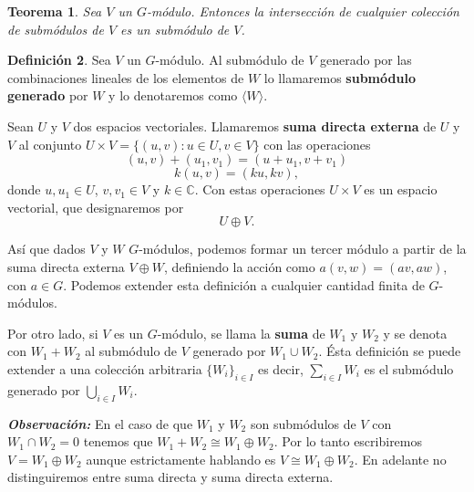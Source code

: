 \documentclass[12pt]{book}
\newtheorem{theorem}{Teorema}[section]
\theoremstyle{definition}
\newtheorem{definition}[theorem]{Definición}
\newcounter{in}
\newcounter{ini}
\begin{document}
\begin{theorem}
  \label{interseccion-submodulos}
  Sea $V$ un $G$-módulo. Entonces la intersección de cualquier
  colección de submódulos de $V$ es un submódulo de $V$.
\end{theorem}

\begin{definition}
  Sea $V$ un $G$-módulo. Al submódulo de $V$ generado por las combinaciones lineales de los
  elementos de $W$ lo llamaremos \textbf{submódulo generado} por $W$ y lo denotaremos como $\langle W\rangle$.
\end{definition}

Sean $U$ y $V$ dos espacios vectoriales. Llamaremos \textbf{suma
  directa externa} de
$U$ y $V$ al conjunto $U\times V=\{(u,v):u\in U,v\in V\}$ con las operaciones
$$(u,v)+(u_{1},v_{1})=(u+u_{1},v+v_{1})$$
$$k(u,v)=(ku,kv),$$
donde $u,u_{1}\in U$, $v,v_{1}\in V$ y $k\in \mathbb{C}$. Con estas
operaciones $U\times V$ es un espacio vectorial, que designaremos por
$$U\oplus V.$$

Así que dados $V$ y $W$ $G$-módulos, podemos formar un tercer módulo a partir
de la suma directa externa $V\oplus W$, definiendo la acción como
$a(v,w)=(av,aw)$, con $a\in G$. Podemos extender esta definición a cualquier
cantidad finita de $G$-módulos.

Por otro lado, si $V$ es un $G$-módulo, se llama la \textbf{suma} de $W_{1}$ y $W_{2}$ y se denota con
$W_{1}+W_{2}$ al submódulo de $V$ generado por $W_{1}\cup W_{2}$. Ésta definición se puede extender a una
colección arbitraria $\{W_{i}\}_{i\in I}$ es
decir, $\sum_{i\in I}W_{i}$ es el submódulo generado por $\bigcup_{i\in I}W_{i}$.

\textbf{\emph{Observación:}} En el caso de que $W_{1}$ y $W_{2}$ son
submódulos de $V$ con $W_{1}\cap W_{2}=0$ tenemos que
$W_{1}+W_{2}\cong W_{1}\oplus W_{2}$.  Por lo tanto escribiremos $V=W_{1}\oplus W_{2}$
aunque estrictamente hablando es $V\cong W_{1}\oplus W_{2}$. En adelante no distinguiremos
entre suma directa y suma directa externa.
\end{document}
